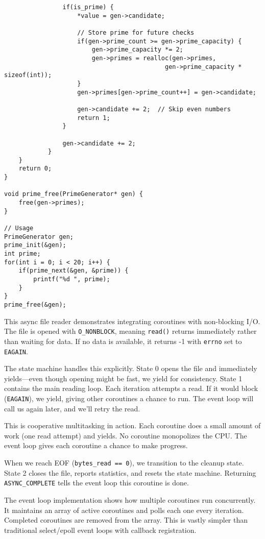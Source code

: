 \begin{lstlisting}
                if(is_prime) {
                    *value = gen->candidate;

                    // Store prime for future checks
                    if(gen->prime_count >= gen->prime_capacity) {
                        gen->prime_capacity *= 2;
                        gen->primes = realloc(gen->primes,
                                            gen->prime_capacity * sizeof(int));
                    }
                    gen->primes[gen->prime_count++] = gen->candidate;

                    gen->candidate += 2;  // Skip even numbers
                    return 1;
                }

                gen->candidate += 2;
            }
    }
    return 0;
}

void prime_free(PrimeGenerator* gen) {
    free(gen->primes);
}

// Usage
PrimeGenerator gen;
prime_init(&gen);
int prime;
for(int i = 0; i < 20; i++) {
    if(prime_next(&gen, &prime)) {
        printf("%d ", prime);
    }
}
prime_free(&gen);
\end{lstlisting}

This async file reader demonstrates integrating coroutines with non-blocking I/O. The file is opened with \texttt{O\_NONBLOCK}, meaning \texttt{read()} returns immediately rather than waiting for data. If no data is available, it returns -1 with \texttt{errno} set to \texttt{EAGAIN}.

The state machine handles this explicitly. State 0 opens the file and immediately yields---even though opening might be fast, we yield for consistency. State 1 contains the main reading loop. Each iteration attempts a read. If it would block (\texttt{EAGAIN}), we yield, giving other coroutines a chance to run. The event loop will call us again later, and we'll retry the read.

This is cooperative multitasking in action. Each coroutine does a small amount of work (one read attempt) and yields. No coroutine monopolizes the CPU. The event loop gives each coroutine a chance to make progress.

When we reach EOF (\texttt{bytes\_read == 0}), we transition to the cleanup state. State 2 closes the file, reports statistics, and resets the state machine. Returning \texttt{ASYNC\_COMPLETE} tells the event loop this coroutine is done.

The event loop implementation shows how multiple coroutines run concurrently. It maintains an array of active coroutines and polls each one every iteration. Completed coroutines are removed from the array. This is vastly simpler than traditional select/epoll event loops with callback registration.


